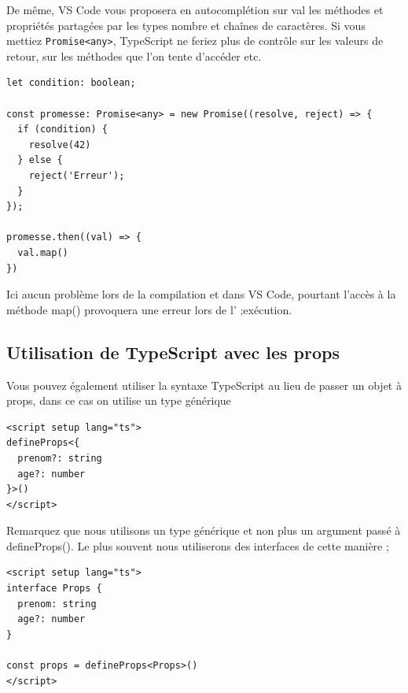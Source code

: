 \documentclass{article}
\begin{document}
De même, {\color{monOrange}VS Code} vous proposera en autocomplétion sur {\color{monOrange}val} les méthodes et propriétés partagées par les types nombre et chaînes de caractères. Si vous mettiez {\tt Promise<any>}, {\color{monOrange}TypeScript} ne feriez plus de contrôle sur les valeurs de retour, sur les méthodes que l'on tente d'accéder etc.
\begin{verbatim}
let condition: boolean;

const promesse: Promise<any> = new Promise((resolve, reject) => {
  if (condition) {
    resolve(42)
  } else {
    reject('Erreur');
  }
});

promesse.then((val) => {
  val.map()
})
\end{verbatim}
Ici aucun problème lors de la compilation et dans {\color{monOrange}VS Code}, pourtant l'accès à la méthode {\color{monOrange}map()} provoquera une erreur lors de l' ;exécution.

\subsection{Utilisation de {\color{monOrange}TypeScript} avec les {\color{monOrange}props}}
Vous pouvez également utiliser la syntaxe {\color{monOrange}TypeScript} au lieu de passer un objet à {\color{monOrange}props}, dans ce cas on utilise un type générique
\begin{verbatim}
<script setup lang="ts">
defineProps<{
  prenom?: string
  age?: number
}>()
</script>
\end{verbatim}
Remarquez que nous utilisons un type générique et non plus un argument passé à {\color{monOrange}defineProps()}. Le plus souvent nous utiliserons des {\color{monOrange}interfaces} de cette manière ;
\begin{verbatim}
<script setup lang="ts">
interface Props {
  prenom: string
  age?: number
}

const props = defineProps<Props>()
</script>
\end{verbatim}

\end{document}
